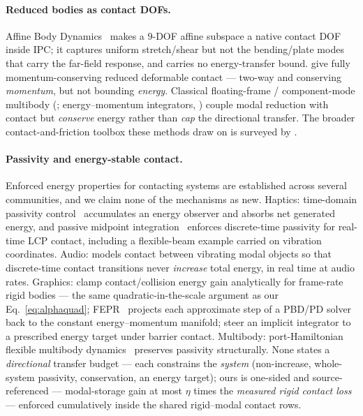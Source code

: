 \paragraph*{Reduced bodies as contact DOFs.} Affine Body
Dynamics~\citep{lan2022abd} makes a $9$-DOF affine subspace a native contact DOF
inside IPC; it captures uniform stretch/shear but not the bending/plate modes that
carry the far-field response, and carries no energy-transfer bound.
\citet{sheth2015} give fully momentum-conserving reduced deformable contact ---
two-way and conserving \emph{momentum}, but not bounding \emph{energy}. Classical
floating-frame / component-mode multibody (\citealp{shabana_multibody};
energy--momentum integrators, \citealp{betsch2007}) couple modal reduction with
contact but \emph{conserve} energy rather than \emph{cap} the directional transfer.
The broader contact-and-friction toolbox these methods draw on is surveyed by
\citet{andrews2022contact}.

\paragraph*{Passivity and energy-stable contact.} Enforced energy properties for
contacting systems are established across several communities, and we claim none
of the mechanisms as new. Haptics: time-domain passivity
control~\citep{hannaford2002} accumulates an energy observer and absorbs net
generated energy, and passive midpoint integration~\citep{kim2017pmi} enforces
discrete-time passivity for real-time LCP contact, including a flexible-beam
example carried on vibration coordinates. Audio: \citet{rath2008} models contact
between vibrating modal objects so that discrete-time contact transitions never
\emph{increase} total energy, in real time at audio rates. Graphics:
\citet{su2009energy} clamp contact/collision energy gain analytically for
frame-rate rigid bodies --- the same quadratic-in-the-scale argument as our
Eq.~\ref{eq:alphaquad}; FEPR~\citep{dinev2018fepr} projects each approximate
step of a PBD/PD solver back to the constant energy--momentum manifold;
\citet{you2026energy} steer an implicit integrator to a prescribed energy
target under barrier contact. Multibody: port-Hamiltonian flexible multibody
dynamics~\citep{brugnoli2021} preserves passivity structurally. None states a
\emph{directional} transfer budget --- each constrains the \emph{system}
(non-increase, whole-system passivity, conservation, an energy target); ours
is one-sided and source-referenced --- modal-storage gain at most $\eta$
times the \emph{measured rigid contact loss} --- enforced cumulatively inside
the shared rigid--modal contact rows.

